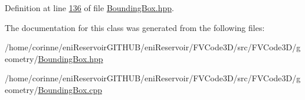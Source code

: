 Definition at line \hyperlink{BoundingBox_8hpp_source_l00136}{136} of file \hyperlink{BoundingBox_8hpp_source}{Bounding\+Box.\+hpp}.



The documentation for this class was generated from the following files\+:\begin{DoxyCompactItemize}
\item 
/home/corinne/eni\+Reservoir\+G\+I\+T\+H\+U\+B/eni\+Reservoir/\+F\+V\+Code3\+D/src/\+F\+V\+Code3\+D/geometry/\hyperlink{BoundingBox_8hpp}{Bounding\+Box.\+hpp}\item 
/home/corinne/eni\+Reservoir\+G\+I\+T\+H\+U\+B/eni\+Reservoir/\+F\+V\+Code3\+D/src/\+F\+V\+Code3\+D/geometry/\hyperlink{BoundingBox_8cpp}{Bounding\+Box.\+cpp}\end{DoxyCompactItemize}
